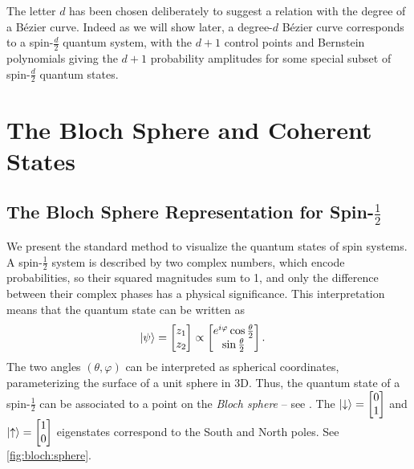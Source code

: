 \documentclass[12pt,final,3p]{elsarticle}
\begin{document}
The letter $d$ has been chosen deliberately to suggest a relation with the degree of a B\'{e}zier curve. Indeed as we will show later, a degree-$d$ B\'{e}zier curve corresponds to a spin-$\frac{d}{2}$ quantum system, with the $d+1$ control points and Bernstein polynomials giving the $d+1$ probability amplitudes for some special subset of spin-$\frac{d}{2}$ quantum states.

\section{The Bloch Sphere and Coherent States}\label{sec:spinfacts}
\subsection{The Bloch Sphere Representation for Spin-$\frac{1}{2}$}\label{sec:spinfacts:bloch}
We present the standard method to visualize the quantum states of spin systems. A spin-$\frac{1}{2}$ system is described by two complex numbers, which encode probabilities, so their squared magnitudes sum to 1, and only the difference between their complex phases has a physical significance. This interpretation means that the quantum state can be written as
\begin{align}
\ket{\psi} &= 
\begin{bmatrix} z_{1} \\ z_{2} \end{bmatrix} \propto \begin{bmatrix} e^{i\varphi}\cos{\frac{\theta}{2}} \\ \sin{\frac{\theta}{2}} \end{bmatrix}.
\end{align}
The two angles $(\theta,\varphi)$ can be interpreted as spherical coordinates, parameterizing the surface of a unit sphere in 3D. Thus, the quantum state of a spin-$\frac{1}{2}$ can be associated to a point on the \emph{Bloch sphere} -- see \cite[Ch. 5.2]{bengtsson2006geometry}. The $\ket{\downarrow} = \begin{bmatrix}
0 \\ 
1
\end{bmatrix}$ 
and 
$\ket{\uparrow} = \begin{bmatrix}
1 \\ 
0
\end{bmatrix}$ eigenstates correspond to the South and North poles. See \autoref{fig:bloch:sphere}.
\end{document}
